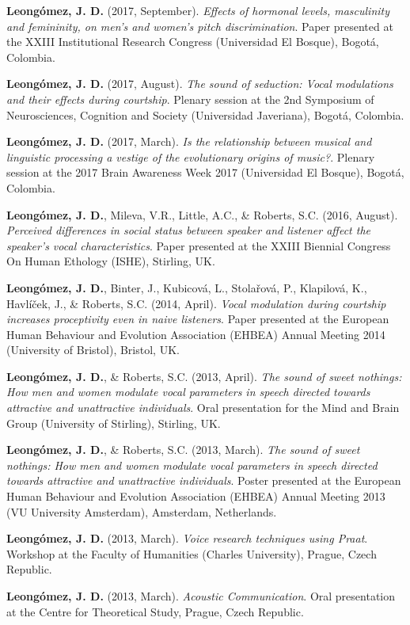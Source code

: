 \documentclass[11pt, a4paper]{awesome-cv}
\begin{document}
\textbf{Leongómez, J. D.} (2017, September). \emph{Effects of hormonal
levels, masculinity and femininity, on men's and women's pitch
discrimination}. Paper presented at the XXIII Institutional Research
Congress (Universidad El Bosque), Bogotá, Colombia.

\textbf{Leongómez, J. D.} (2017, August). \emph{The sound of seduction:
Vocal modulations and their effects during courtship}. Plenary session
at the 2nd Symposium of Neurosciences, Cognition and Society
(Universidad Javeriana), Bogotá, Colombia.

\textbf{Leongómez, J. D.} (2017, March). \emph{Is the relationship
between musical and linguistic processing a vestige of the evolutionary
origins of music?}. Plenary session at the 2017 Brain Awareness Week
2017 (Universidad El Bosque), Bogotá, Colombia.

\textbf{Leongómez, J. D.}, Mileva, V.R., Little, A.C., \& Roberts, S.C.
(2016, August). \emph{Perceived differences in social status between
speaker and listener affect the speaker's vocal characteristics}. Paper
presented at the XXIII Biennial Congress On Human Ethology (ISHE),
Stirling, UK.

\textbf{Leongómez, J. D.}, Binter, J., Kubicová, L., Stolařová, P.,
Klapilová, K., Havlíček, J., \& Roberts, S.C. (2014, April). \emph{Vocal
modulation during courtship increases proceptivity even in naive
listeners}. Paper presented at the European Human Behaviour and
Evolution Association (EHBEA) Annual Meeting 2014 (University of
Bristol), Bristol, UK.

\textbf{Leongómez, J. D.}, \& Roberts, S.C. (2013, April). \emph{The
sound of sweet nothings: How men and women modulate vocal parameters in
speech directed towards attractive and unattractive individuals}. Oral
presentation for the Mind and Brain Group (University of Stirling),
Stirling, UK.

\textbf{Leongómez, J. D.}, \& Roberts, S.C. (2013, March). \emph{The
sound of sweet nothings: How men and women modulate vocal parameters in
speech directed towards attractive and unattractive individuals}. Poster
presented at the European Human Behaviour and Evolution Association
(EHBEA) Annual Meeting 2013 (VU University Amsterdam), Amsterdam,
Netherlands.

\textbf{Leongómez, J. D.} (2013, March). \emph{Voice research techniques
using Praat}. Workshop at the Faculty of Humanities (Charles
University), Prague, Czech Republic.

\textbf{Leongómez, J. D.} (2013, March). \emph{Acoustic Communication}.
Oral presentation at the Centre for Theoretical Study, Prague, Czech
Republic.
\end{document}
